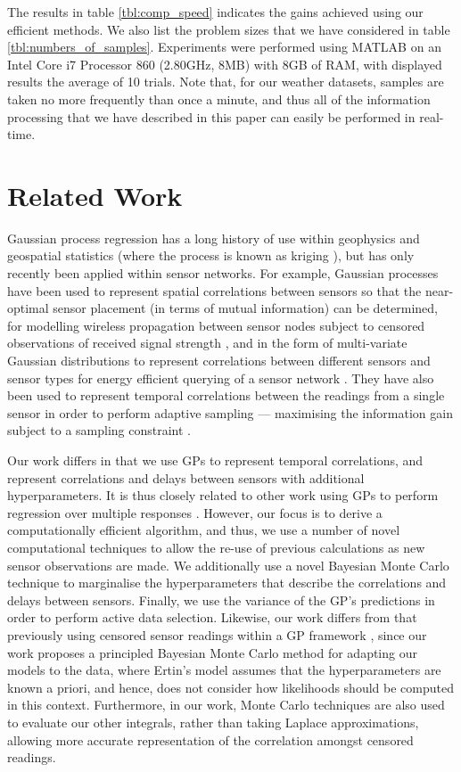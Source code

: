 \documentclass{acmtrans2m}
\begin{document}
The results in table \ref{tbl:comp_speed} indicates the gains achieved using our efficient methods. We also list the problem sizes that we have considered in table \ref{tbl:numbers_of_samples}. Experiments were performed using MATLAB on an Intel Core i7 Processor 860 (2.80GHz, 8MB) with 8GB of RAM, with displayed results the average of 10 trials.  Note that, for our weather datasets, samples are taken no more frequently than once a minute, and thus all of the information processing that we have described in this paper can easily be performed in real-time.


\section{Related Work}\label{sec_related}

\noindent Gaussian process regression has a long history of use within geophysics and geospatial statistics (where the process is known as kriging \cite{cressie}), but has only recently been applied within sensor networks. For example, Gaussian processes have been used to represent spatial correlations between sensors so that the near-optimal sensor placement (in terms of mutual information) can be determined, for modelling wireless propagation between sensor nodes subject to censored observations of received signal strength \cite{ertin2007gpm}, and in the form of multi-variate Gaussian distributions to represent correlations between different sensors and sensor types for energy efficient querying of a sensor network \cite{guestrin2}. They have also been used to represent temporal correlations between the readings from a single sensor in order to perform adaptive sampling --- maximising the information gain subject to a sampling constraint \cite{1525857}.

Our work differs in that we use GPs to represent temporal correlations, and represent correlations and delays between sensors with additional hyperparameters. It is thus closely related to other work using GPs to perform regression over multiple responses \cite{dep_GP,latent_factor}. However, our focus is to derive a computationally efficient algorithm, and thus, we use a number of novel computational techniques to allow the re-use of previous calculations as new sensor observations are made. We additionally use a novel Bayesian Monte Carlo technique to marginalise the hyperparameters that describe the correlations and delays between sensors. Finally, we use the variance of the GP's predictions in order to perform active data selection. Likewise, our work differs from that previously using censored sensor readings within a GP framework \cite{ertin2007gpm}, since our work proposes a principled Bayesian Monte Carlo method for adapting our models to the data, where Ertin's model assumes that the hyperparameters are known a priori, and hence, does not consider how likelihoods should be computed in this context. Furthermore, in our work, Monte Carlo techniques are also used to evaluate our other integrals, rather than taking Laplace approximations, allowing more accurate representation of the correlation amongst censored readings. 
\end{document}
